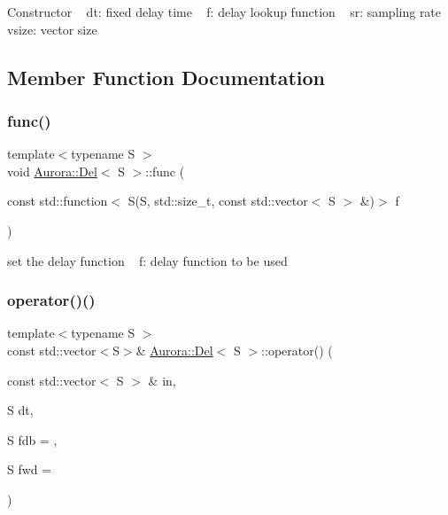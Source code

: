 Constructor ~\newline
dt\+: fixed delay time ~\newline
f\+: delay lookup function ~\newline
sr\+: sampling rate ~\newline
vsize\+: vector size 

\subsection{Member Function Documentation}
\mbox{\label{class_aurora_1_1_del_aeaf2a09c658c57e3e29793ea8af092d3}} 
\subsubsection{\texorpdfstring{func()}{func()}}
{\footnotesize\ttfamily template$<$typename S $>$ \\
void \hyperlink{class_aurora_1_1_del}{Aurora\+::\+Del}$<$ S $>$\+::func (\begin{DoxyParamCaption}\item[{const std\+::function$<$ S(S, std\+::size\+\_\+t, const std\+::vector$<$ S $>$ \&)$>$}]{f }\end{DoxyParamCaption})\hspace{0.3cm}{\ttfamily [inline]}}

set the delay function ~\newline
f\+: delay function to be used \mbox{\label{class_aurora_1_1_del_a7061e3fc28fa7c9cace2f194c0c2933b}} 
\subsubsection{\texorpdfstring{operator()()}{operator()()}\hspace{0.1cm}{\footnotesize\ttfamily [1/2]}}
{\footnotesize\ttfamily template$<$typename S $>$ \\
const std\+::vector$<$S$>$\& \hyperlink{class_aurora_1_1_del}{Aurora\+::\+Del}$<$ S $>$\+::operator() (\begin{DoxyParamCaption}\item[{const std\+::vector$<$ S $>$ \&}]{in,  }\item[{S}]{dt,  }\item[{S}]{fdb = {},  }\item[{S}]{fwd = {} }\end{DoxyParamCaption})\hspace{0.3cm}{\ttfamily [inline]}}

